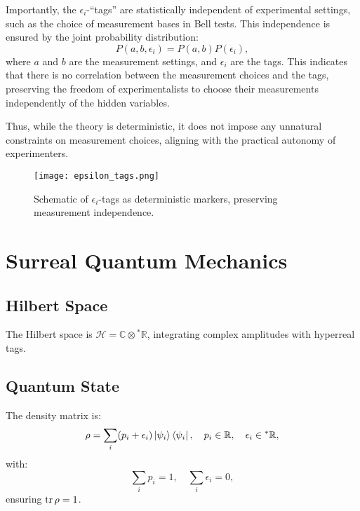 \documentclass{article}
\begin{document}
Importantly, the \(\epsilon_i\)-``tags'' are statistically independent of experimental settings, such as the choice of measurement bases in Bell tests. This independence is ensured by the joint probability distribution:
\begin{equation}
P(a, b, \epsilon_i) = P(a, b) P(\epsilon_i),
\end{equation}
where \(a\) and \(b\) are the measurement settings, and \(\epsilon_i\) are the tags. This indicates that there is no correlation between the measurement choices and the tags, preserving the freedom of experimentalists to choose their measurements independently of the hidden variables.

Thus, while the theory is deterministic, it does not impose any unnatural constraints on measurement choices, aligning with the practical autonomy of experimenters.

\begin{figure}[h]
    \centering
    \texttt{[image: epsilon\_tags.png]}
    \caption{Schematic of \(\epsilon_i\)-tags as deterministic markers, preserving measurement independence.}
    \label{fig:epsilon_tags}
\end{figure}

\section{Surreal Quantum Mechanics}
\subsection{Hilbert Space}
The Hilbert space is \(\mathcal{H} = \mathbb{C} \otimes {}^*\mathbb{R}\), integrating complex amplitudes with hyperreal tags.

\subsection{Quantum State}
The density matrix is:
\begin{equation}
\rho = \sum_i (p_i + \epsilon_i) \ket{\psi_i}\bra{\psi_i}, \quad p_i \in \mathbb{R}, \quad \epsilon_i \in {}^*\mathbb{R},
\end{equation}
with:
\begin{equation}
\sum_i p_i = 1, \quad \sum_i \epsilon_i = 0,
\end{equation}
ensuring \(\tr \rho = 1\).
\end{document}

